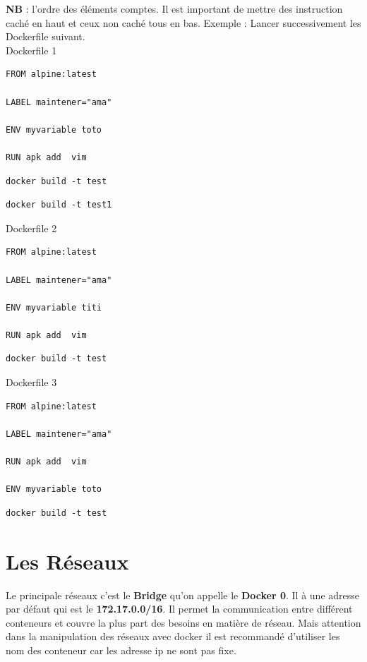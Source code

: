 \documentclass[12pt,a4paper]{article}
\begin{document}
\textbf{NB } : l'ordre des éléments comptes. Il est important de mettre des instruction
caché en haut et ceux non caché tous en bas.
Exemple : Lancer successivement les Dockerfile suivant.\\
Dockerfile 1
\begin{verbatim}
FROM alpine:latest

LABEL maintener="ama"

ENV myvariable toto

RUN apk add  vim
\end{verbatim} 
\begin{verbatim}
docker build -t test
\end{verbatim}
\begin{verbatim}
docker build -t test1
\end{verbatim}
Dockerfile 2
\begin{verbatim}
FROM alpine:latest

LABEL maintener="ama"

ENV myvariable titi

RUN apk add  vim
\end{verbatim} 
\begin{verbatim}
docker build -t test
\end{verbatim}
Dockerfile 3
\begin{verbatim}
FROM alpine:latest

LABEL maintener="ama"

RUN apk add  vim

ENV myvariable toto
\end{verbatim} 
\begin{verbatim}
docker build -t test
\end{verbatim}

\section{Les Réseaux}
Le principale réseaux c'est le \textbf{Bridge} qu'on appelle le \textbf{Docker 0}.
Il à une adresse par défaut qui est le
\textbf{172.17.0.0/16}. Il permet la communication entre différent conteneurs et couvre 
la plus part des besoins en matière de réseau. Mais attention dans la manipulation des 
réseaux avec docker il est recommandé d'utiliser les nom des conteneur car les adresse 
ip ne sont pas fixe.
\end{document}
